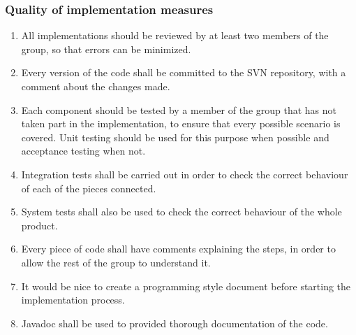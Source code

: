 \subsubsection{Quality of implementation measures}

\begin{enumerate}
  \item All implementations should be reviewed by at least two members of the group, so that errors can be minimized.
  \item Every version of the code shall be committed to the SVN repository, with a comment about the changes made.
  \item Each component should be tested by a member of the group that has not taken part in the implementation, to ensure that every possible scenario is covered. Unit testing should be used for this purpose when possible and acceptance testing when not.
  \item Integration tests shall be carried out in order to check the correct behaviour of each of the pieces connected.
  \item System tests shall also be used to check the correct behaviour of the whole product. 
  \item Every piece of code shall have comments explaining the steps, in order to allow the rest of the group to understand it. 
  \item It would be nice to create a programming style document before starting the implementation process.
  \item Javadoc shall be used to provided thorough documentation of the code.
\end{enumerate}
